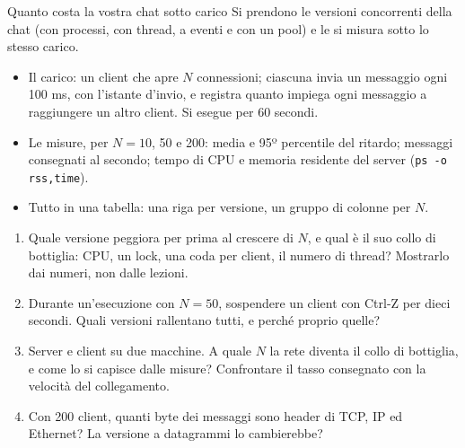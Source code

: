 \begin{esercizio}{Quanto costa la vostra chat sotto carico}
Si prendono le versioni concorrenti della chat (con processi, con thread, a eventi e con un pool) e le si misura sotto lo stesso carico.
\begin{itemize}
    \item Il carico: un client che apre $N$ connessioni; ciascuna invia un messaggio ogni 100 ms, con l'istante d'invio, e registra quanto
          impiega ogni messaggio a raggiungere un altro client. Si esegue per 60 secondi.
    \item Le misure, per $N = 10$, 50 e 200: media e 95º percentile del ritardo; messaggi consegnati al secondo; tempo di CPU e memoria
          residente del server (\texttt{ps -o rss,time}).
    \item Tutto in una tabella: una riga per versione, un gruppo di colonne per $N$.
\end{itemize}
\begin{enumerate}[label=(\alph*)]
    \item Quale versione peggiora per prima al crescere di $N$, e qual è il suo collo di bottiglia: CPU, un lock, una coda per client, il
          numero di thread? Mostrarlo dai numeri, non dalle lezioni.
    \item Durante un'esecuzione con $N = 50$, sospendere un client con Ctrl-Z per dieci secondi. Quali versioni rallentano tutti, e perché
          proprio quelle?
    \item Server e client su due macchine. A quale $N$ la rete diventa il collo di bottiglia, e come lo si capisce dalle misure? Confrontare
          il tasso consegnato con la velocità del collegamento.
    \item Con 200 client, quanti byte dei messaggi sono header di TCP, IP ed Ethernet? La versione a datagrammi lo cambierebbe?
\end{enumerate}


\end{esercizio}
